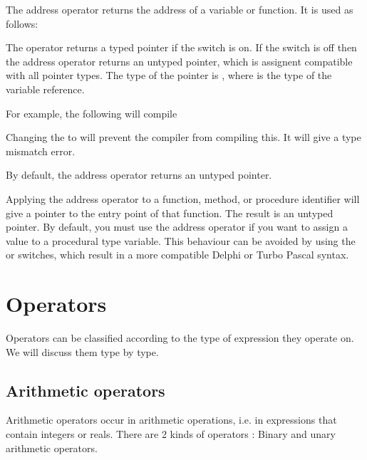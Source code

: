 \documentclass{report}
\begin{document}
The address operator  returns the address of a variable or function.
It is used as follows:



The  operator returns a typed pointer if the  switch is on. 
If the  switch is off then the address operator returns an untyped
pointer, which is assignent compatible with all pointer types. The type of
the pointer is , where  is the type of the variable
reference.

For example, the following will compile
Changing the  to  will prevent the compiler from
compiling this. It will give a type mismatch error.

By default, the address operator returns an untyped pointer.

Applying the address operator to a function, method, or procedure identifier
will give a pointer to the entry point of that function. The result is an
untyped pointer. 
By default, you must use the address operator if you want to assign a value 
to a procedural type variable. This behaviour can be avoided by using the
 or  switches, which result in a more compatible Delphi or
Turbo Pascal syntax.

\section{Operators}

Operators can be classified according to the type of expression they
operate on. We will discuss them type by type.

\subsection{Arithmetic operators}

Arithmetic operators occur in arithmetic operations, i.e. in expressions
that contain integers or reals. There are 2 kinds of operators : Binary and
unary arithmetic operators. 
\end{document}
